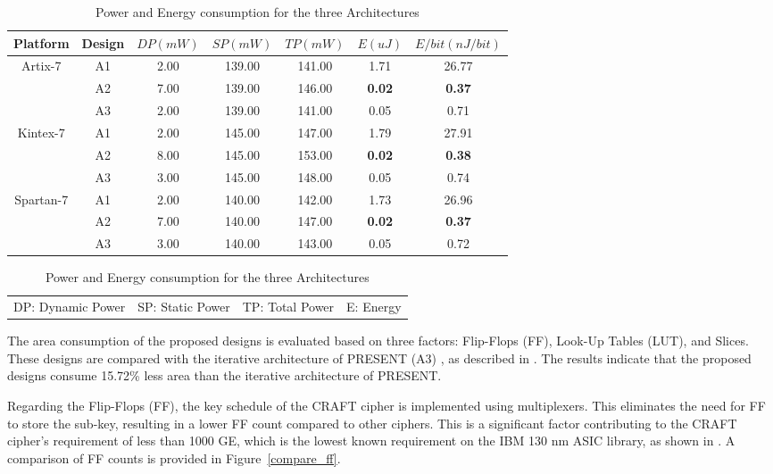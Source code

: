 \documentclass[final,5p,times,twocolumn]{elsarticle}
\begin{document}
\begin{table}
    \begin{threeparttable}
        \caption{Power and Energy consumption for the three Architectures}\label{power_energy_compare}%
        \begin{tabular*}{\textwidth}{@{\extracolsep\fill}|c|c|c|c|c|c|c|}
            \hline
            Platform & Design & $DP(mW)$ & $SP(mW)$ & $TP(mW)$ & $E(uJ)$ & $E/bit(nJ/bit)$ \\
            \hline
            \multirow{3}{*}{Artix-7}  & A1 & 2.00 & 139.00 & 141.00 & 1.71 & 26.77 \\
            & A2 & 7.00 & 139.00 & 146.00 & \textbf{0.02} & \textbf{0.37} \\
            & A3 & 2.00 & 139.00 & 141.00 & 0.05 & 0.71 \\
            \hline
            \multirow{3}{*}{Kintex-7} & A1 & 2.00 & 145.00 & 147.00 & 1.79 & 27.91 \\
            & A2 & 8.00 & 145.00 & 153.00 & \textbf{0.02} & \textbf{0.38} \\
            & A3 & 3.00 & 145.00 & 148.00 & 0.05 & 0.74 \\
            \hline
            \multirow{3}{*}{Spartan-7} & A1 & 2.00 & 140.00 & 142.00 & 1.73 & 26.96 \\
            & A2 & 7.00 & 140.00 & 147.00 & \textbf{0.02} & \textbf{0.37} \\
            & A3 & 3.00 & 140.00 & 143.00 & 0.05 & 0.72 \\
            \hline
        \end{tabular*}
        \begin{tabular}{llll}
            DP: Dynamic Power & SP: Static Power & TP: Total Power & E: Energy
        \end{tabular}
    \end{threeparttable}
\end{table}

The area consumption of the proposed designs is evaluated based on three factors: Flip-Flops (FF), Look-Up Tables (LUT), and Slices. These designs are compared with the iterative architecture of PRESENT (A3) , as described in \cite{Bharathi2022}. The results indicate that the proposed designs consume 15.72\% less area than the iterative architecture of PRESENT.

Regarding the Flip-Flops (FF), the key schedule of the CRAFT cipher is implemented using multiplexers. This eliminates the need for FF to store the sub-key, resulting in a lower FF count compared to other ciphers. This is a significant factor contributing to the CRAFT cipher's requirement of less than 1000 GE, which is the lowest known requirement on the IBM 130 nm ASIC library, as shown in \cite{Beierle2019}. A comparison of FF counts is provided in Figure~\ref{compare_ff}.
\end{document}
